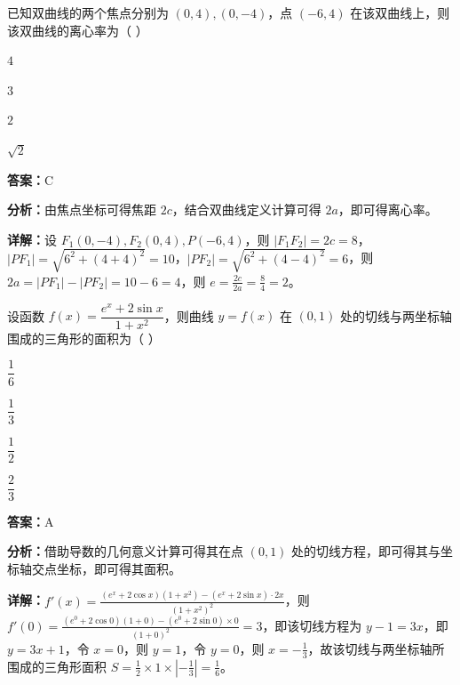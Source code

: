 \begin{question}[points=5]
已知双曲线的两个焦点分别为 $(0,4),(0,-4)$，点 $(-6,4)$ 在该双曲线上，则该双曲线的离心率为（   ）
\begin{choices}
  \item $4$
  \item $3$
  \item $2$
  \item $\sqrt{2}$
\end{choices}
\begin{solution}
\textbf{答案：}C

\textbf{分析：}由焦点坐标可得焦距 $2c$，结合双曲线定义计算可得 $2a$，即可得离心率。

\textbf{详解：}设 $F_1(0,-4),F_2(0,4),P(-6,4)$，则 $|F_1F_2|=2c=8$，$|PF_1|=\sqrt{6^2+(4+4)^2}=10$，$|PF_2|=\sqrt{6^2+(4-4)^2}=6$，则 $2a=|PF_1|-|PF_2|=10-6=4$，则 $e=\frac{2c}{2a}=\frac{8}{4}=2$。
\end{solution}
\end{question}

\begin{question}[points=5]
设函数 $f(x)=\dfrac{e^x+2\sin x}{1+x^2}$，则曲线 $y=f(x)$ 在 $(0,1)$ 处的切线与两坐标轴围成的三角形的面积为（   ）
\begin{choices}
  \item $\dfrac{1}{6}$
  \item $\dfrac{1}{3}$
  \item $\dfrac{1}{2}$
  \item $\dfrac{2}{3}$
\end{choices}
\begin{solution}
\textbf{答案：}A

\textbf{分析：}借助导数的几何意义计算可得其在点 $(0,1)$ 处的切线方程，即可得其与坐标轴交点坐标，即可得其面积。

\textbf{详解：}$f'(x)=\frac{(e^x+2\cos x)(1+x^2)-(e^x+2\sin x)\cdot2x}{(1+x^2)^2}$，则 $f'(0)=\frac{(e^0+2\cos0)(1+0)-(e^0+2\sin0)\times0}{(1+0)^2}=3$，即该切线方程为 $y-1=3x$，即 $y=3x+1$，令 $x=0$，则 $y=1$，令 $y=0$，则 $x=-\frac{1}{3}$，故该切线与两坐标轴所围成的三角形面积 $S=\frac{1}{2}\times1\times\left|-\frac{1}{3}\right|=\frac{1}{6}$。
\end{solution}
\end{question}

